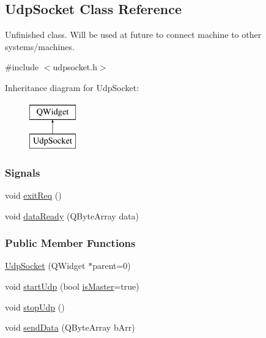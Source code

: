 \hypertarget{classUdpSocket}{}\subsection{Udp\+Socket Class Reference}
\label{classUdpSocket}

Unfinished class. Will be used at future to connect machine to other systems/machines.

{\ttfamily \#include $<$udpsocket.\+h$>$}

Inheritance diagram for Udp\+Socket\+:\begin{figure}[H]
\begin{center}
\leavevmode
\includegraphics[height=2.000000cm]{classUdpSocket}
\end{center}
\end{figure}
\subsubsection*{Signals}
\begin{DoxyCompactItemize}
\item 
void \mbox{\hyperlink{classUdpSocket_a43ebbd10ee3b27bfe0b62b507bf8e2c4}{exit\+Req}} ()
\item 
void \mbox{\hyperlink{classUdpSocket_af24c4f2c6b77c9999e8638aead581477}{data\+Ready}} (Q\+Byte\+Array data)
\end{DoxyCompactItemize}
\subsubsection*{Public Member Functions}
\begin{DoxyCompactItemize}
\item 
\mbox{\hyperlink{classUdpSocket_a25a2f670352d9f600143c370beafd8f6}{Udp\+Socket}} (Q\+Widget $\ast$parent=0)
\item 
void \mbox{\hyperlink{classUdpSocket_aca3bb48ba03494ee09ed46a9e6d27ffb}{start\+Udp}} (bool \mbox{\hyperlink{classUdpSocket_aa5132ded0322787b898fa346a42f7dce}{is\+Master}}=true)
\item 
void \mbox{\hyperlink{classUdpSocket_a508506f2a8a7bbfa04a010ac491f9fa9}{stop\+Udp}} ()
\item 
void \mbox{\hyperlink{classUdpSocket_a1d66f093f85db5ae4df98a57adfeb322}{send\+Data}} (Q\+Byte\+Array b\+Arr)
\end{DoxyCompactItemize}
